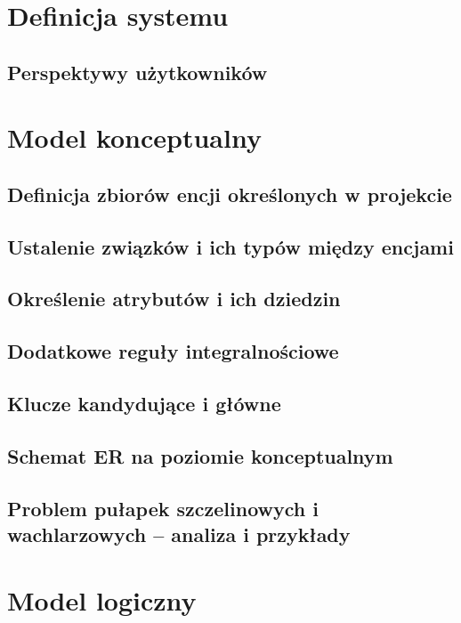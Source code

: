 \documentclass{mwrep}
\begin{document}
\chapter{Definicja systemu}

\section{Perspektywy użytkowników}


\chapter{Model konceptualny}

\section{Definicja zbiorów encji określonych w projekcie}

\section{Ustalenie związków i ich typów między encjami}

\section{Określenie atrybutów i ich dziedzin}

\section{Dodatkowe reguły integralnościowe}

\section{Klucze kandydujące i główne}

\section{Schemat ER na poziomie konceptualnym}

\section{Problem pułapek szczelinowych i wachlarzowych – analiza i przykłady}



\chapter{Model logiczny}
\end{document}
